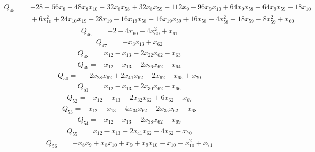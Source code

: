 \documentclass[11pt]{article}
\theoremstyle{definition}\newtheorem{definition}[theorem]{Definition}
\begin{document}
{%
\begin{align*}
 Q_{45}={}&-28 -56x_{8} -48x_{8}x_{10} +32x_{8}x_{58} +32x_{8}x_{59} -112x_{9} -96x_{9}x_{10} +64x_{9}x_{58} +64x_{9}x_{59} -18x_{10}\\
 &{}+6x_{10}^{2} +24x_{10}x_{19} +28x_{19} -16x_{19}x_{58} -16x_{19}x_{59} +16x_{58} -4x_{58}^{2} +18x_{59} -8x_{59}^{2} +x_{60}
\end{align*}
\begin{align*}
 Q_{46}={}&-2 -4x_{60} -4x_{60}^{2} +x_{61}
\end{align*}
\begin{align*}
 Q_{47}={}&-x_{3}x_{13} +x_{62}
\end{align*}
\begin{align*}
 Q_{48}={}&x_{12} -x_{13} -2x_{22}x_{62} -x_{63}
\end{align*}
\begin{align*}
 Q_{49}={}&x_{12} -x_{13} -2x_{26}x_{62} -x_{64}
\end{align*}
\begin{align*}
 Q_{50}={}&-2x_{28}x_{62} +2x_{41}x_{62} -2x_{62} -x_{65} +x_{70}
\end{align*}
\begin{align*}
 Q_{51}={}&x_{12} -x_{13} -2x_{30}x_{62} -x_{66}
\end{align*}
\begin{align*}
 Q_{52}={}&x_{12} -x_{13} -2x_{32}x_{62} +6x_{62} -x_{67}
\end{align*}
\begin{align*}
 Q_{53}={}&x_{12} -x_{13} -4x_{34}x_{62} -2x_{35}x_{62} -x_{68}
\end{align*}
\begin{align*}
 Q_{54}={}&x_{12} -x_{13} -2x_{38}x_{62} -x_{69}
\end{align*}
\begin{align*}
 Q_{55}={}&x_{12} -x_{13} -2x_{41}x_{62} -4x_{62} -x_{70}
\end{align*}
\begin{align*}
 Q_{56}={}&-x_{8}x_{9} +x_{8}x_{10} +x_{9} +x_{9}x_{10} -x_{10} -x_{10}^{2} +x_{71}
\end{align*}
}
\end{document}
